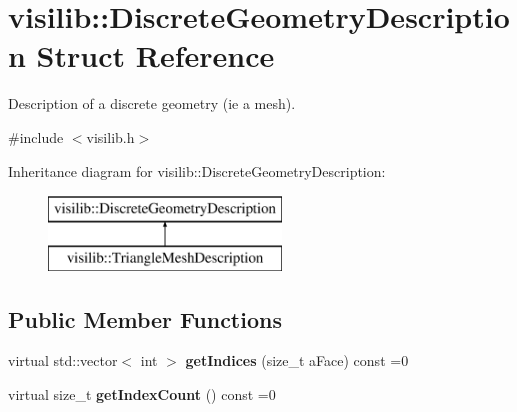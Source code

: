 \hypertarget{structvisilib_1_1_discrete_geometry_description}{}\section{visilib\+::Discrete\+Geometry\+Description Struct Reference}
\label{structvisilib_1_1_discrete_geometry_description}


Description of a discrete geometry (ie a mesh).  




{\ttfamily \#include $<$visilib.\+h$>$}

Inheritance diagram for visilib\+::Discrete\+Geometry\+Description\+:\begin{figure}[H]
\begin{center}
\leavevmode
\includegraphics[height=2.000000cm]{structvisilib_1_1_discrete_geometry_description}
\end{center}
\end{figure}
\subsection*{Public Member Functions}
\begin{DoxyCompactItemize}
\item 
\mbox{\label{structvisilib_1_1_discrete_geometry_description_a69b9b700b3f03b54f919c4b90da51cdf}} 
virtual std\+::vector$<$ int $>$ {\bfseries get\+Indices} (size\+\_\+t a\+Face) const =0
\item 
\mbox{\label{structvisilib_1_1_discrete_geometry_description_a3a41016600ed8cd641fbbee519c17584}} 
virtual size\+\_\+t {\bfseries get\+Index\+Count} () const =0
\end{DoxyCompactItemize}

